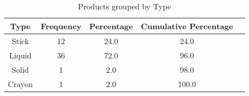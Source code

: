 \begin{table}[htbp]
    \centering
    \caption{Products grouped by Type}
    \label{tab:change label here}
    \begin{tabular}{ccccc}        \hline
        \textbf{Type} & \textbf{Frequency} & \textbf{Percentage} & \textbf{Cumulative Percentage} \\ \hline
        Stick         & 12                 & 24.0                & 24.0                           \\
        Liquid        & 36                 & 72.0                & 96.0                           \\
        Solid         & 1                  & 2.0                 & 98.0                           \\
        Crayon        & 1                  & 2.0                 & 100.0                          \\
    \end{tabular}
\end{table}